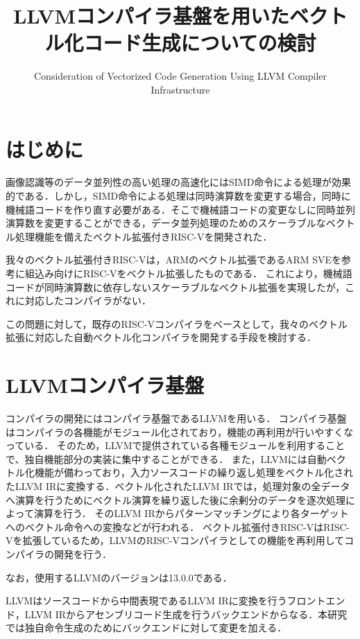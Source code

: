 ﻿\documentclass[a4j]{jarticle}
\title{LLVMコンパイラ基盤を用いたベクトル化コード生成についての検討}
\author{Consideration of Vectorized Code Generation Using LLVM Compiler Infrastructure}
\begin{document}
\maketitle

\section{はじめに}
画像認識等のデータ並列性の高い処理の高速化にはSIMD命令による処理が効果的である．しかし，SIMD命令による処理は同時演算数を変更する場合，同時に機械語コードを作り直す必要がある．そこで機械語コードの変更なしに同時並列演算数を変更することができる，データ並列処理のためのスケーラブルなベクトル処理機能を備えたベクトル拡張付きRISC-Vを開発された\cite{bib:kimura}．

我々のベクトル拡張付きRISC-Vは，ARMのベクトル拡張であるARM SVE\cite{bib:arm_sve}を参考に組込み向けにRISC-V\cite{bib:risc-v}をベクトル拡張したものである．
これにより，機械語コードが同時演算数に依存しないスケーラブルなベクトル拡張を実現したが，これに対応したコンパイラがない．

この問題に対して，既存のRISC-Vコンパイラをベースとして，我々のベクトル拡張に対応した自動ベクトル化コンパイラを開発する手段を検討する．

\section{LLVMコンパイラ基盤}
コンパイラの開発にはコンパイラ基盤であるLLVM\cite{bib:llvm}を用いる．
コンパイラ基盤はコンパイラの各機能がモジュール化されており，機能の再利用が行いやすくなっている．
そのため，LLVMで提供されている各種モジュールを利用することで、独自機能部分の実装に集中することができる．
また，LLVMには自動ベクトル化機能が備わっており，入力ソースコードの繰り返し処理をベクトル化されたLLVM IRに変換する．ベクトル化されたLLVM IRでは，処理対象の全データへ演算を行うためにベクトル演算を繰り返した後に余剰分のデータを逐次処理によって演算を行う．
そのLLVM IRからパターンマッチングにより各ターゲットへのベクトル命令への変換などが行われる．
ベクトル拡張付きRISC-VはRISC-Vを拡張しているため，LLVMのRISC-Vコンパイラとしての機能を再利用してコンパイラの開発を行う．

なお，使用するLLVMのバージョンは13.0.0である．

LLVMはソースコードから中間表現であるLLVM IRに変換を行うフロントエンド，LLVM IRからアセンブリコード生成を行うバックエンドからなる．本研究では独自命令生成のためにバックエンドに対して変更を加える．
\end{document}
